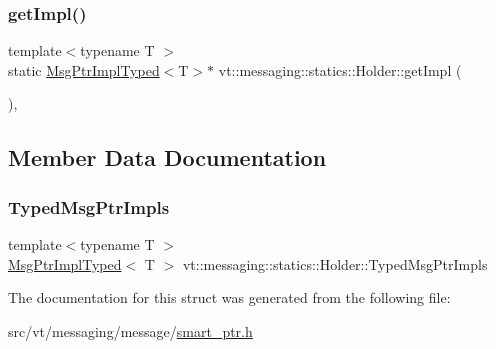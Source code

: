 \subsubsection{\texorpdfstring{get\+Impl()}{getImpl()}}
{\footnotesize\ttfamily template$<$typename T $>$ \\
static \hyperlink{structvt_1_1messaging_1_1_msg_ptr_impl_typed}{Msg\+Ptr\+Impl\+Typed}$<$T$>$$\ast$ vt\+::messaging\+::statics\+::\+Holder\+::get\+Impl (\begin{DoxyParamCaption}{ }\end{DoxyParamCaption})\hspace{0.3cm}{\ttfamily [inline]}, {\ttfamily [static]}}



\subsection{Member Data Documentation}
\mbox{\label{structvt_1_1messaging_1_1statics_1_1_holder_aa2947eaef3eac9d1ad3e25cdf5e75b5b}} 
\subsubsection{\texorpdfstring{Typed\+Msg\+Ptr\+Impls}{TypedMsgPtrImpls}}
{\footnotesize\ttfamily template$<$typename T $>$ \\
\hyperlink{structvt_1_1messaging_1_1_msg_ptr_impl_typed}{Msg\+Ptr\+Impl\+Typed}$<$ T $>$ vt\+::messaging\+::statics\+::\+Holder\+::\+Typed\+Msg\+Ptr\+Impls\hspace{0.3cm}{\ttfamily [static]}}



The documentation for this struct was generated from the following file\+:\begin{DoxyCompactItemize}
\item 
src/vt/messaging/message/\hyperlink{smart__ptr_8h}{smart\+\_\+ptr.\+h}\end{DoxyCompactItemize}
